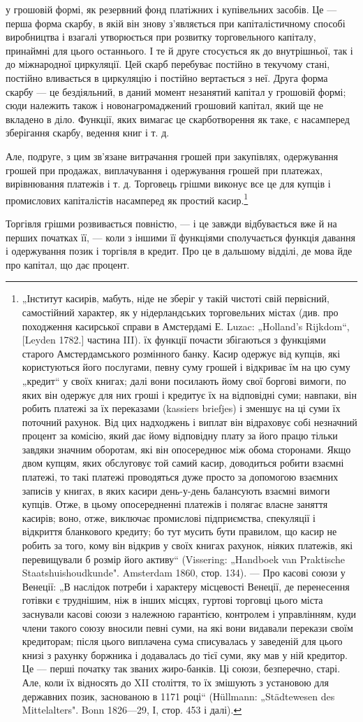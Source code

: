 у грошовій формі, як резервний фонд платіжних і купівельних
засобів. Це — перша форма скарбу, в якій він знову з’являється
при капіталістичному способі виробництва і взагалі утворюється
при розвитку торговельного капіталу, принаймні для цього
останнього. І те й друге стосується як до внутрішньої, так і до
міжнародної циркуляції. Цей скарб перебуває постійно в текучому
стані, постійно вливається в циркуляцію і постійно вертається
з неї. Друга форма скарбу — це бездіяльний, в даний
момент незанятий капітал у грошовій формі; сюди належить
також і новонагромаджений грошовий капітал, який ще не
вкладено в діло. Функції, яких вимагає це скарботворення як
таке, є насамперед зберігання скарбу, ведення книг і т. д.

Але, подруге, з цим зв’язане витрачання грошей при закупівлях,
одержування грошей при продажах, виплачування і одержування
грошей при платежах, вирівнювання платежів і т. д.
Торговець грішми виконує все це для купців і промислових
капіталістів насамперед як простий касир.\footnote{
„Інститут касирів, мабуть, ніде не зберіг у такій чистоті свій первісний,
самостійний характер, як у нідерландських торговельних містах (див. про
походження касирської справи в Амстердамі Е. Luzac: „Holland’s Rijkdom“,
[Leyden 1782.] частина III). їх функції почасти збігаються з функціями старого
Амстердамського розмінного банку. Касир одержує від купців, які користуються
його послугами, певну суму грошей і відкриває їм на цю суму „кредит“
у своїх книгах; далі вони посилають йому свої боргові вимоги, по яких він
одержує для них гроші і кредитує їх на відповідні суми; навпаки, він робить
платежі за їх переказами (kassiers briefjes) і зменшує на ці суми їх поточний
рахунок. Від цих надходжень і виплат він відраховує собі незначний процент
за комісію, який дає йому відповідну плату за його працю тільки завдяки
значним оборотам, які він опосереднює між обома сторонами. Якщо двом купцям,
яких обслуговує той самий касир, доводиться робити взаємні платежі, то
такі платежі проводяться дуже просто за допомогою взаємних записів у книгах,
в яких касири день-у-день балансують взаємні вимоги купців. Отже, в цьому
опосередненні платежів і полягає власне заняття касирів; воно, отже, виключає
промислові підприємства, спекуляції і відкриття бланкового кредиту; бо тут
мусить бути правилом, що касир не робить за того, кому він відкрив у своїх
книгах рахунок, ніяких платежів, які перевищували б розмір його активу“
(Vissering: „Handboek van Praktische Staatshuishoudkunde". Amsterdam 1860,
стор. 134). — Про касові союзи у Венеції: „В наслідок потреби і характеру
місцевості Венеції, де перенесення готівки є труднішим, ніж в інших місцях,
гуртові торговці цього міста заснували касові союзи з належною гарантією,
контролем і управлінням, куди члени такого союзу вносили певні суми, на
які вони видавали перекази своїм кредиторам; після цього виплачена сума
списувалась у заведеній для цього книзі з рахунку боржника і додавалась до
тієї суми, яку мав у ній кредитор. Це — перші початку так званих жиро-банків.
Ці союзи, безперечно, старі. Але, коли їх відносять до XII століття, то їх
змішують з установою для державних позик, заснованою в 1171 році“ (Нüllmann:
„Städtewesen des Mittelalters". Bonn 1826—29, І, стор. 453 і далі).
}

Торгівля грішми розвивається повністю, — і це завжди відбувається
вже й на перших початках її, — коли з іншими її функціями
сполучається функція давання і одержування позик і торгівля
в кредит. Про це в дальшому відділі, де мова йде про капітал,
що дає процент.